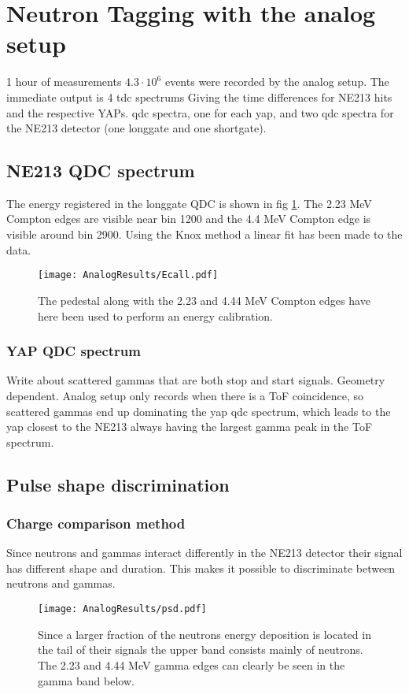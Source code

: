 \documentclass[main.tex]{subfiles}
\begin{document}
\section{Neutron Tagging with the analog setup}

1 hour of measurements $4.3\cdot 10^{6}$ events were recorded by the analog setup. The immediate output is 4 tdc spectrums Giving the time differences for NE213 hits and the respective YAPs. qdc spectra, one for each yap, and two qdc spectra for the NE213 detector (one longgate and one shortgate).
\subsection{NE213 QDC spectrum}
The energy registered in the longgate QDC is shown in fig \ref{fig:qdc_a}. The 2.23 MeV Compton edges are visible near bin 1200 and the 4.4 MeV Compton edge is visible around bin 2900. Using the Knox method a linear fit has been made to the data.
\begin{figure}[ht!]
    \centering
        \texttt{[image: AnalogResults/Ecall.pdf]}
        \caption{The pedestal along with the 2.23 and 4.44 MeV Compton edges have here been used to perform an energy calibration.}
    \label{fig:qdc_a}
\end{figure}

\subsubsection{YAP QDC spectrum}
Write about scattered gammas that are both stop and start signals. Geometry dependent. Analog setup only records when there is a ToF coincidence, so scattered gammas end up dominating the yap qdc spectrum, which leads to the yap closest to the NE213 always having the largest gamma peak in the ToF spectrum. 

\subsection{Pulse shape discrimination}
\subsubsection{Charge comparison method}
Since neutrons and gammas interact differently in the NE213 detector their signal has different shape and duration. This makes it possible to discriminate between neutrons and gammas.
\begin{figure}[h]
    \centering
        \texttt{[image: AnalogResults/psd.pdf]}
        \caption{Since a larger fraction of the neutrons energy deposition is located in the tail of their signals the upper band consists mainly of neutrons. The 2.23 and 4.44 MeV gamma edges can clearly be seen in the gamma band below.}
        \label{fig:hex_a}
\end{figure}
\end{document}
